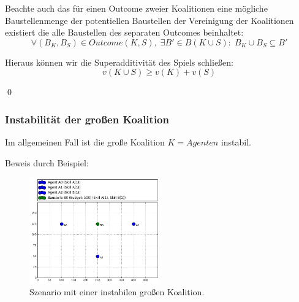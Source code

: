 %
%
Beachte auch das für einen Outcome zweier Koalitionen eine mögliche Baustellenmenge der potentiellen Baustellen der Vereinigung der Koalitionen existiert die alle Baustellen des separaten Outcomes beinhaltet:
\begin{equation}
  \forall (B_K, B_S)\in Outcome(K,S),\; \exists B'\in B(K\cup S):\; B_K\cup B_S\subseteq B'
\end{equation}

\noindent
Hieraus können wir die Superadditivität des Spiels schließen:
\begin{equation}
  v(K\cup S) \geq v(K) + v(S)
\end{equation}
\begin{flushright}
  \qed
\end{flushright}

\subsubsection{Instabilität der großen Koalition}
\label{instabil}

\begin{lemma}
  Im allgemeinen Fall ist die große Koalition $K=Agenten$ instabil.
\end{lemma}

Beweis durch Beispiel:
\begin{figure}
  \centering
  \includegraphics[width=0.5\textwidth]{example-exchangeable-agents.png}
  \caption{Szenario mit einer instabilen großen Koalition.}
  \label{szenario1}
\end{figure}

